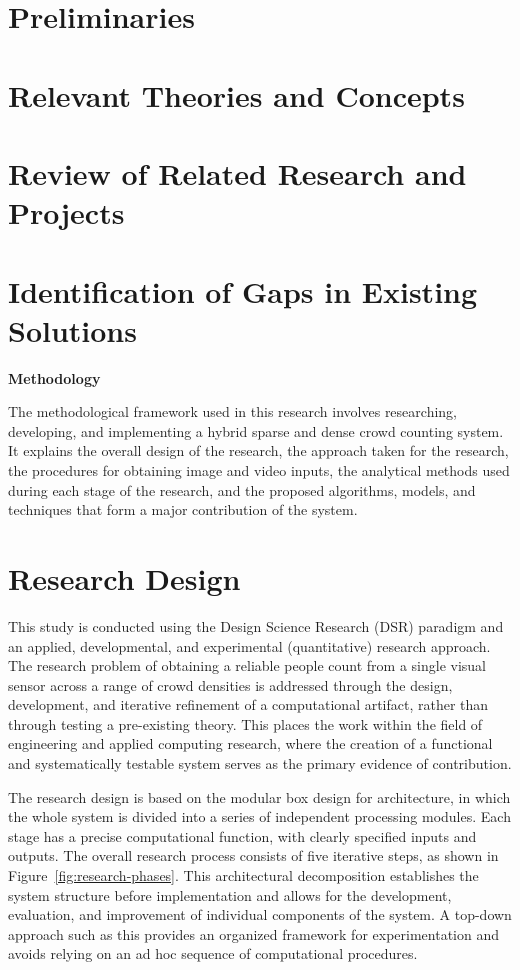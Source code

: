 \documentclass[12pt,a4paper]{report}
\newcommand{\chapterpage}[1]{%
    \clearpage
    \phantomsection
    \addcontentsline{toc}{chapter}{\protect\numberline{\thechapter}#1}
    \thispagestyle{empty}

    \vspace*{\fill}
    \begin{center}
        {\fontsize{32}{38}\selectfont\bfseries #1}
    \end{center}
    \vspace*{\fill}

    \clearpage
}
\begin{document}
\section{Preliminaries}
\section{Relevant Theories and Concepts}
\section{Review of Related Research and Projects}
\section{Identification of Gaps in Existing Solutions}


\chapterpage{Methodology}

The methodological framework used in this research involves researching, developing, and implementing a hybrid sparse and dense crowd counting system. It explains the overall design of the research, the approach taken for the research, the procedures for obtaining image and video inputs, the analytical methods used during each stage of the research, and the proposed algorithms, models, and techniques that form a major contribution of the system.

\section{Research Design}

This study is conducted using the Design Science Research (DSR) paradigm and an applied, developmental, and experimental (quantitative) research approach. The research problem of obtaining a reliable people count from a single visual sensor across a range of crowd densities is addressed through the design, development, and iterative refinement of a computational artifact, rather than through testing a pre-existing theory. This places the work within the field of engineering and applied computing research, where the creation of a functional and systematically testable system serves as the primary evidence of contribution.

The research design is based on the modular box design for architecture, in which the whole system is divided into a series of independent processing modules. Each stage has a precise computational function, with clearly specified inputs and outputs. The overall research process consists of five iterative steps, as shown in Figure~\ref{fig:research-phases}. This architectural decomposition establishes the system structure before implementation and allows for the development, evaluation, and improvement of individual components of the system. A top-down approach such as this provides an organized framework for experimentation and avoids relying on an ad hoc sequence of computational procedures.
\end{document}
